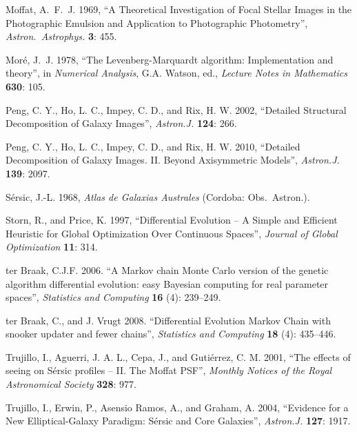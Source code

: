 \documentclass[10pt,a4paper,article]{memoir}
\begin{document}
\begin{thebibliography}{}
 Moffat, A.~F.~J. 1969, ``A Theoretical
Investigation of Focal Stellar Images in the Photographic Emulsion and
Application to Photographic Photometry'', \textit{Astron.\ Astrophys.} \textbf{3}: 455.

 Mor{\'e}, J.~J. 1978, ``The
Levenberg-Marquardt algorithm: Implementation and theory'', in
\textit{Numerical Analysis}, G.A. Watson, ed., \textit{Lecture Notes in
Mathematics} \textbf{630}: 105.

 Peng, C. Y., Ho, L. C., Impey, C. D., and
Rix, H. W. 2002, ``Detailed Structural Decomposition of Galaxy Images'',
\textit{Astron.J.} \textbf{124}: 266.

 Peng, C. Y., Ho, L. C., Impey, C. D., and
Rix, H. W. 2010, ``Detailed Decomposition of Galaxy Images. II. Beyond
Axisymmetric Models'', \textit{Astron.J.} \textbf{139}: 2097.

 S{\'e}rsic, J.-L. 1968, \textit{Atlas de 
Galaxias Australes} (Cordoba: Obs.\ Astron.).

 Storn, R., and Price, K. 1997, ``Differential
Evolution -- A Simple and Efficient Heuristic for Global Optimization Over
Continuous Spaces'', \textit{Journal of Global Optimization} \textbf{11}: 314.

 ter Braak, C.J.F. 2006.
``A Markov chain Monte Carlo version of the genetic
algorithm differential evolution: easy Bayesian computing for real
parameter spaces'', \textit{Statistics and Computing} \textbf{16} (4): 239--249.

 ter Braak, C., and J.
Vrugt 2008. ``Differential Evolution Markov Chain with snooker updater
and fewer chains'', \textit{Statistics and Computing} \textbf{18} (4): 435--446.

 Trujillo, I., Aguerri, J. A. L.,
Cepa, J., and Guti{\'e}rrez, C. M. 2001, ``The effects of seeing on S{\'e}rsic
profiles -- II. The Moffat PSF'', \textit{Monthly Notices of the Royal
Astronomical Society} \textbf{328}: 977.

 Trujillo, I., Erwin, P., Asensio
Ramos, A., and Graham, A. 2004, ``Evidence for a New Elliptical-Galaxy Paradigm:
S{\'e}rsic and Core Galaxies'', \textit{Astron.J.} \textbf{127}: 1917.


\end{thebibliography}
\end{document}
